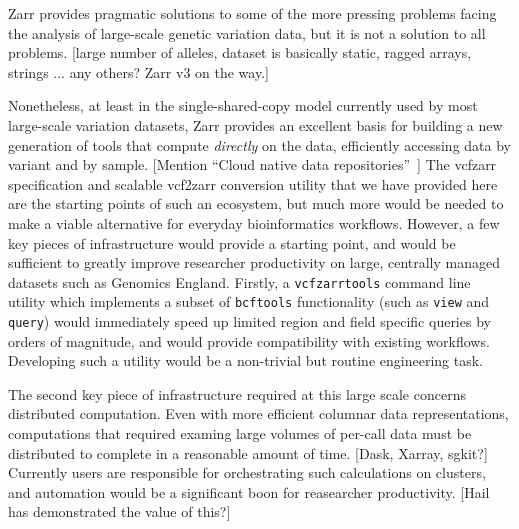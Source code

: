 \documentclass[a4paper,num-refs]{oup-contemporary}
\begin{document}
Zarr provides pragmatic solutions to some of the more pressing 
problems facing the analysis of large-scale genetic variation
data, but it is not a solution to all problems. [large number
of alleles, dataset is basically static, ragged arrays,
strings ... any others? Zarr v3 on the way.]

Nonetheless, at least in the single-shared-copy model currently
used by most large-scale variation datasets, Zarr provides
an excellent basis for building a new generation of tools 
that compute \emph{directly} on the data, efficiently
accessing data by variant and by sample.
[Mention ``Cloud native data repositories''~\cite{abernathey2021cloud}]
The vcfzarr specification and scalable vcf2zarr conversion utility
that we have provided here are the starting points of such 
an ecosystem, but much more would be needed to make a viable 
alternative for everyday bioinformatics workflows. However, a few key
pieces of infrastructure would provide a starting point, and would 
be sufficient to greatly improve researcher productivity on 
large, centrally managed datasets such as Genomics England.
Firstly, a \texttt{vcfzarrtools} command line utility which 
implements a subset of \texttt{bcftools} functionality (such as 
\texttt{view} and \texttt{query}) would immediately speed up 
limited region and field specific queries by orders of magnitude,
and would provide compatibility with existing workflows.
Developing such a utility would be a non-trivial but routine
engineering task.

The second key piece of infrastructure required at this large 
scale concerns distributed computation. Even with more efficient
columnar data representations, computations that required examing 
large volumes of per-call data must be distributed to complete 
in a reasonable amount of time. [Dask, Xarray, sgkit?]
Currently users are responsible for orchestrating such calculations
on clusters, and automation would be a significant boon
for reasearcher productivity. [Hail has demonstrated the value of this?]



\end{document}
